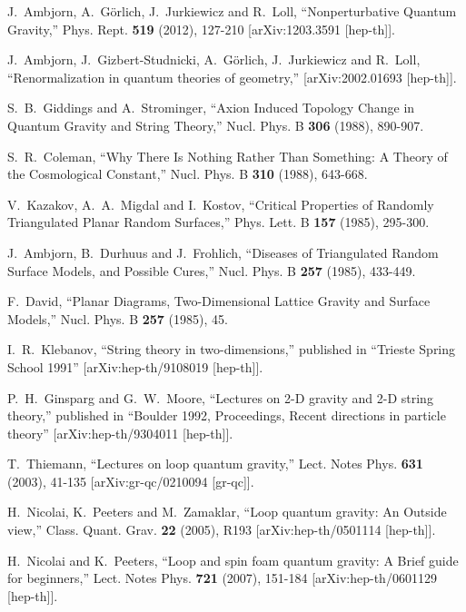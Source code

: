\documentclass[12pt]{article}
\numberwithin{equation}{section}
\begin{document}
\begin{thebibliography}{999}
J.~Ambjorn, A.~G\"orlich, J.~Jurkiewicz and R.~Loll,
``Nonperturbative Quantum Gravity,''
Phys. Rept. \textbf{519} (2012), 127-210
[arXiv:1203.3591 [hep-th]].

J.~Ambjorn, J.~Gizbert-Studnicki, A.~G\"orlich, J.~Jurkiewicz and R.~Loll,
``Renormalization in quantum theories of geometry,''
[arXiv:2002.01693 [hep-th]].

S.~B.~Giddings and A.~Strominger,
``Axion Induced Topology Change in Quantum Gravity and String Theory,''
Nucl. Phys. B \textbf{306} (1988), 890-907. 

S.~R.~Coleman,
``Why There Is Nothing Rather Than Something: A Theory of the Cosmological Constant,''
Nucl. Phys. B \textbf{310} (1988), 643-668.

V.~Kazakov, A.~A.~Migdal and I.~Kostov,
``Critical Properties of Randomly Triangulated Planar Random Surfaces,''
Phys. Lett. B \textbf{157} (1985), 295-300. 

J.~Ambjorn, B.~Durhuus and J.~Frohlich,
``Diseases of Triangulated Random Surface Models, and Possible Cures,''
Nucl. Phys. B \textbf{257} (1985), 433-449.

F.~David,
``Planar Diagrams, Two-Dimensional Lattice Gravity and Surface Models,''
Nucl. Phys. B \textbf{257} (1985), 45.

I.~R.~Klebanov,
``String theory in two-dimensions,'' published in ``Trieste Spring School 1991'' [arXiv:hep-th/9108019 [hep-th]].

P.~H.~Ginsparg and G.~W.~Moore,
``Lectures on 2-D gravity and 2-D string theory,'' published in ``Boulder 1992, Proceedings, Recent directions in particle theory'' [arXiv:hep-th/9304011 [hep-th]].

T.~Thiemann,
``Lectures on loop quantum gravity,''
Lect. Notes Phys. \textbf{631} (2003), 41-135
[arXiv:gr-qc/0210094 [gr-qc]].

H.~Nicolai, K.~Peeters and M.~Zamaklar,
``Loop quantum gravity: An Outside view,''
Class. Quant. Grav. \textbf{22} (2005), R193
[arXiv:hep-th/0501114 [hep-th]].

H.~Nicolai and K.~Peeters,
``Loop and spin foam quantum gravity: A Brief guide for beginners,''
Lect. Notes Phys. \textbf{721} (2007), 151-184
[arXiv:hep-th/0601129 [hep-th]].


\end{thebibliography}
\end{document}
